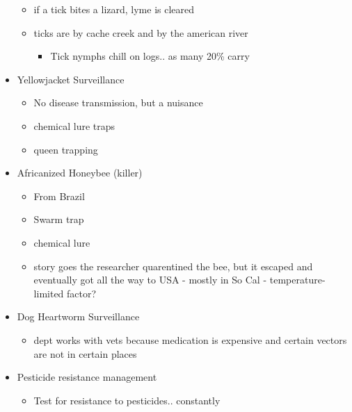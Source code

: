 \documentclass{article}
\begin{document}
\begin{itemize}
\begin{itemize}
            \item if a tick bites a lizard, lyme is cleared
            \item ticks are by cache creek and by the american river
            \begin{itemize}
                \item Tick nymphs chill on logs.. as many 20\% carry
            \end{itemize}
        \end{itemize}
        \item Yellowjacket Surveillance
        \begin{itemize}
            \item No disease transmission, but a nuisance
            \item chemical lure traps
            \item queen trapping
        \end{itemize}
        \item Africanized Honeybee (killer)
        \begin{itemize}
            \item From Brazil
            \item Swarm trap
            \item chemical lure
            \item story goes the researcher quarentined the bee, but it escaped and eventually got all the way to USA - mostly in So Cal - temperature-limited factor?
        \end{itemize}
        \item Dog Heartworm Surveillance
        \begin{itemize}
            \item dept works with vets because medication is expensive and certain vectors are not in certain places
        \end{itemize}
        \item Pesticide resistance management
        \begin{itemize}
            \item Test for resistance to pesticides.. constantly
        \end{itemize}
    \end{itemize}
\end{document}
